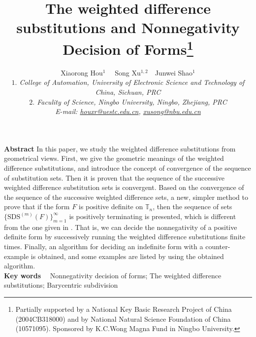 \documentclass [10pt,a4paper]{article}
\begin{document}
\newtheorem{theorem}{Theorem}[section]
\newtheorem{definition}{Def\mbox{}inition}[section]
\newtheorem{lemma}{Lemma}[section]
\newtheorem{corollary}{Corollary}[section]


\title{The weighted dif\mbox{}ference substitutions and Nonnegativity Decision of Forms\footnote{ Partially supported by a
National Key Basic Research Project of China (2004CB318000) and by
National Natural Science Foundation of China (10571095). Sponsored
by K.C.Wong Magna Fund in Ningbo University. }}
\date{}

\author{
 Xiaorong Hou$^1$~~ Song Xu$^{1,2}$~~Junwei Shao$^1$\\
 \textit{\small $1.$ College of Automation,
University of Electronic Science and Technology of China, Sichuan,
PRC}\\
 \textit{\small $2.$ Faculity of Science, Ningbo University, Ningbo,
Zhejiang, PRC}\\
\textit{\small E-mail:
\href{mailto:houxr@uestc.edu.cn}{houxr@uestc.edu.cn},
\href{mailto:xusong@nbu.edu.cn}{xusong@nbu.edu.cn} }}


 \maketitle
{\noindent\small  {\bf Abstract} In this paper, we study the
weighted dif\mbox{}ference substitutions from geometrical views.
First, we give the geometric meanings of the weighted
dif\mbox{}ference substitutions, and introduce the concept of
convergence of the sequence of substitution sets.    Then it is
proven that the
 sequence of the successive
weighted dif\mbox{}ference substitution sets is convergent.  Based
on the convergence
 of the sequence of the successive weighted
dif\mbox{}ference sets,  a new, simpler method to prove that if the
form  $F$ is positive def\mbox{}inite on $\mathbb{T}_n$, then the
sequence of  sets $\{\textrm{SDS}^{(m)}(F)\}_{m=1}^\infty$ is
positively terminating is presented,  which is dif\mbox{}ferent from
the one given in \cite{Yong:1}. That is, we can decide the
nonnegativity of a positive definite form by
 successively running the weighted
dif\mbox{}ference substitutions finite times. Finally, an algorithm
for deciding an indef\mbox{}inite form with a counter-example  is
obtained, and
 some examples are listed  by using the obtained algorithm.  }\\[2ex]

 {\noindent\small {\bf Key words}~~  Nonnegativity decision of forms; The weighted
dif\mbox{}ference
 substitutions; Barycentric subdivision}
\\[2ex]
\end{document}
